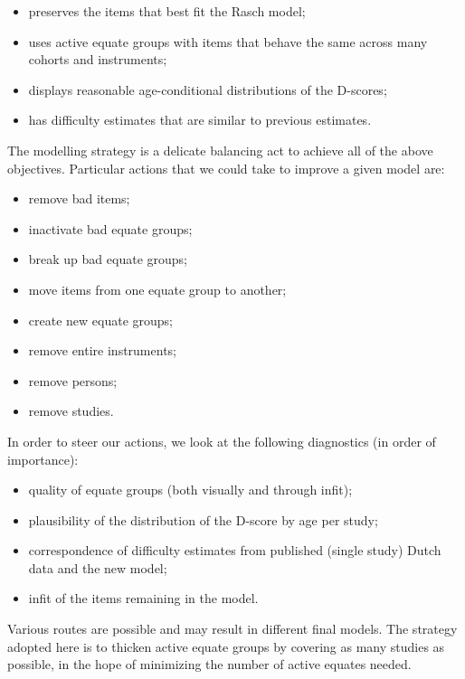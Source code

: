 \documentclass[
]{book}
\providecommand{\tightlist}{%
  \setlength{\itemsep}{0pt}\setlength{\parskip}{0pt}}
\begin{document}
\begin{itemize}
\tightlist
\item
  preserves the items that best fit the Rasch model;
\item
  uses active equate groups with items that behave the same across many cohorts and instruments;
\item
  displays reasonable age-conditional distributions of the D-scores;
\item
  has difficulty estimates that are similar to previous estimates.
\end{itemize}

The modelling strategy is a delicate balancing act to achieve all of the above objectives. Particular actions that we could take to improve a given model are:

\begin{itemize}
\tightlist
\item
  remove bad items;
\item
  inactivate bad equate groups;
\item
  break up bad equate groups;
\item
  move items from one equate group to another;
\item
  create new equate groups;
\item
  remove entire instruments;
\item
  remove persons;
\item
  remove studies.
\end{itemize}

In order to steer our actions, we look at the following diagnostics (in order of importance):

\begin{itemize}
\tightlist
\item
  quality of equate groups (both visually and through infit);
\item
  plausibility of the distribution of the D-score by age per study;
\item
  correspondence of difficulty estimates from published (single study) Dutch data and the new model;
\item
  infit of the items remaining in the model.
\end{itemize}

Various routes are possible and may result in different final models. The strategy adopted here is to thicken active equate groups by covering as many studies as possible, in the hope of minimizing the number of active equates needed.
\end{document}
